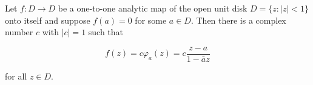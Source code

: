 Let $f: D \to D$ be a one-to-one analytic map of the open unit disk $D = \{z : |z| < 1\}$ onto itself and suppose $f(a) = 0$ for some $a \in D$. Then there is a complex number $c$ with $|c| = 1$ such that

$$f(z) = c \varphi_a(z) = c \frac{z - a}{1 - \bar{a}z}$$

for all $z \in D$.
